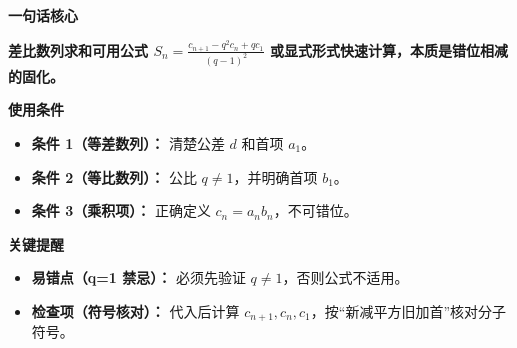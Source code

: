 \begin{summarybox}

\textbf{\textcolor{CSummary}{一句话核心}}

\textbf{差比数列求和可用公式 \(S_n = \frac{c_{n+1} - q^2 c_n + q c_1}{(q-1)^2}\) 或显式形式快速计算，本质是错位相减的固化。}

\medskip
\textbf{\textcolor{CSummary}{使用条件}}
\begin{itemize}[leftmargin=*, itemsep=0.5em, topsep=0.4em]
    \item \textbf{条件 1（等差数列）：} 清楚公差 \(d\) 和首项 \(a_1\)。
    \item \textbf{条件 2（等比数列）：} 公比 \(q \neq 1\)，并明确首项 \(b_1\)。
    \item \textbf{条件 3（乘积项）：} 正确定义 \(c_n = a_n b_n\)，不可错位。
\end{itemize}

\medskip
\textbf{\textcolor{CSummary}{关键提醒}}
\begin{itemize}[leftmargin=*, itemsep=0.5em, topsep=0.4em]
    \item \textbf{易错点（q=1 禁忌）：} 必须先验证 \(q \neq 1\)，否则公式不适用。
    \item \textbf{检查项（符号核对）：} 代入后计算 \(c_{n+1}, c_n, c_1\)，按“新减平方旧加首”核对分子符号。
\end{itemize}
\end{summarybox}
